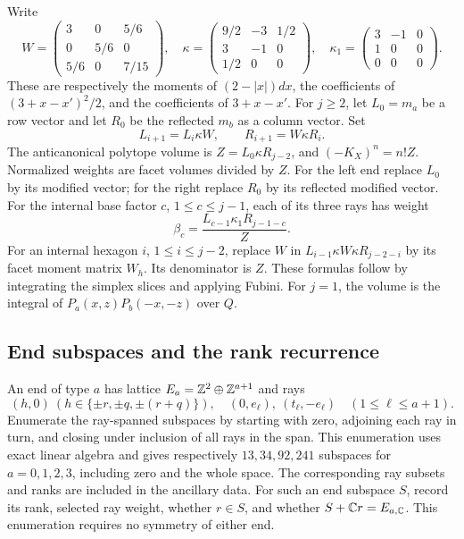 Write
\[
 W=\begin{pmatrix}3&0&5/6\\0&5/6&0\\5/6&0&7/15\end{pmatrix},\quad
 \kappa=\begin{pmatrix}9/2&-3&1/2\\3&-1&0\\1/2&0&0\end{pmatrix},\quad
 \kappa_1=\begin{pmatrix}3&-1&0\\1&0&0\\0&0&0\end{pmatrix}.
\]
These are respectively the moments of $(2-|x|)dx$, the coefficients
of $(3+x-x')^2/2$, and the coefficients of $3+x-x'$.
For $j\ge2$, let $L_0=m_a$ be a row vector and let $R_0$ be the
reflected $m_b$ as a column vector. Set
\[
 L_{i+1}=L_i\kappa W,\qquad R_{i+1}=W\kappa R_i.
\]
The anticanonical polytope volume is
$Z=L_0\kappa R_{j-2}$, and $(-K_X)^n=n!Z$.
Normalized weights are facet volumes divided by $Z$.
For the left end replace $L_0$ by its modified vector; for the right
replace $R_0$ by its reflected modified vector. For the internal base
factor $c$, $1\le c\le j-1$, each of its three rays has weight
\[
 \beta_c=\frac{L_{c-1}\kappa_1R_{j-1-c}}{Z}.
\]
For an internal hexagon $i$, $1\le i\le j-2$, replace $W$ in
$L_{i-1}\kappa W\kappa R_{j-2-i}$ by its facet moment matrix $W_h$.
Its denominator is $Z$. These formulas follow by integrating the
simplex slices and applying Fubini. For $j=1$, the volume is the
integral of $P_a(x,z)P_b(-x,-z)$ over $Q$.

\subsection{End subspaces and the rank recurrence}
An end of type $a$ has lattice $E_a=\mathbb{Z}^2\oplus\mathbb{Z}^{a+1}$ and rays
\[
 (h,0)\ (h\in\{\pm r,\pm q,\pm(r+q)\}),\quad
 (0,e_\ell),\ (t_\ell,-e_\ell)\quad(1\le\ell\le a+1).
\]
Enumerate the ray-spanned subspaces by starting with zero, adjoining
each ray in turn, and closing under inclusion of all rays in the span.
This enumeration uses exact linear algebra and gives respectively
$13,34,92,241$ subspaces for $a=0,1,2,3$, including zero and the whole
space. The corresponding ray subsets and ranks are included in the
ancillary data.
For such an end subspace $S$, record its rank, selected ray weight,
whether $r\in S$, and whether $S+\mathbb{C} r=E_{a,\mathbb{C}}$.
This enumeration requires no symmetry of either end.

